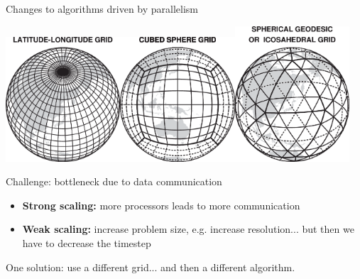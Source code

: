 \documentclass{beamer}
\begin{document}
\begin{frame}{Changes to algorithms driven by parallelism}
  \centerline{\includegraphics[width=0.32\textwidth]{figures/latlon.png}\hfill{}\includegraphics[width=0.32\textwidth]{figures/cs.png}\hfill\includegraphics[width=0.32\textwidth]{figures/icos.png}}
  \begin{block}{Challenge: bottleneck due to data communication}
  \begin{itemize}[leftmargin=0.1in]
    \small
    \item \textbf{Strong scaling:} more processors leads to more communication
    \item \textbf{Weak scaling:} increase problem size, e.g. increase resolution... but then we have to decrease the timestep
    \end{itemize}
  \end{block}
  One solution: use a different grid... and then a different algorithm.
  
\end{frame}
\end{document}
